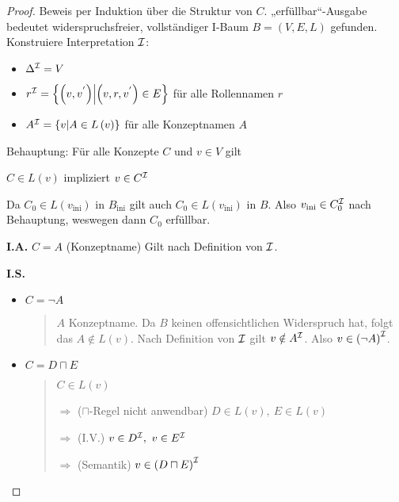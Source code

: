 \begin{proof}

Beweis per Induktion über die Struktur von $C$.
„erfüllbar``-Ausgabe bedeutet widerspruchsfreier, vollständiger I-Baum
$B = \left( V,E,L \right)$ gefunden. Konstruiere Interpretation $\mathcal{I}$:

\begin{itemize}
\item
  $\Delta^{\mathcal{I}} = V$
\item
  $r^{\mathcal{I}} = \left\{ \left( v,v^{'} \right) \middle| \left( v,r,v^{'} \right) \in E \right\}$
  für alle Rollennamen $r$
\item
  $A^{\mathcal{I}} = \left\{ v \middle| A \in L\left( v \right) \right\}$ für
  alle Konzeptnamen $A$
\end{itemize}

Behauptung: Für alle Konzepte $C$ und $v \in V$ gilt

\begin{center}$C \in L\left( v \right)$ impliziert $v \in C^{\mathcal{I}}$\end{center}

Da $C_{0} \in L\left( v_{\text{ini}} \right)$ in $B_{\text{ini}}$ gilt
auch $C_{0} \in L\left( v_{\text{ini}} \right)$ in $B$. Also
$v_{\text{ini}} \in C_{0}^{\mathcal{I}}$ nach Behauptung, weswegen dann
$C_{0}$ erfüllbar.

\textbf{I.A.} $C = A$ (Konzeptname) Gilt nach Definition von
$\mathcal{I}$.

\textbf{I.S.}

\begin{itemize}
\item
  $C = \neg A$

\begin{quote}
$A$ Konzeptname. Da $B$ keinen offensichtlichen Widerspruch hat,
folgt das $A \notin L(v)$. Nach Definition von $\mathcal{I}$ gilt
$v \notin A^{\mathcal{I}}$. Also $v \in \left( \neg A \right)^{\mathcal{I}}$.
\end{quote}

\item
  $C = D \sqcap E$

\begin{quote}
$C \in L\left( v \right)$ 

$\Rightarrow$ ($\sqcap$-Regel nicht anwendbar) $D \in L\left( v \right),\ E \in L\left( v \right)$ 

$\Rightarrow$ (I.V.) $v \in D^{\mathcal{I}},\ v \in E^{\mathcal{I}}$ 

$\Rightarrow$ (Semantik) $v \in \left( D \sqcap E \right)^{\mathcal{I}}$
\end{quote}


\end{itemize}
\end{proof}

